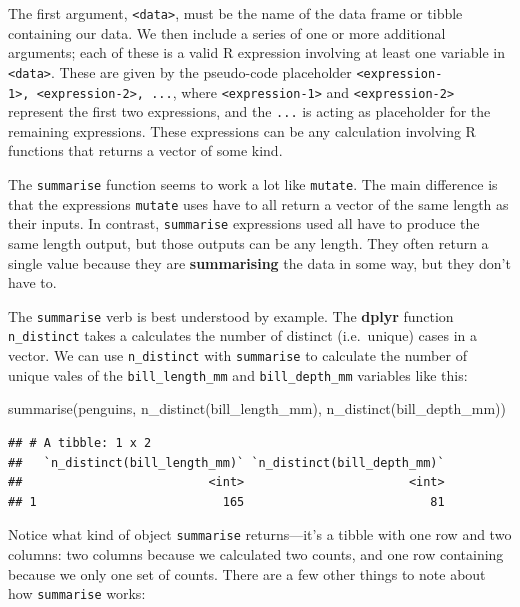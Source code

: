 \documentclass[
]{book}
\newenvironment{Shaded}{\begin{snugshade}}{\end{snugshade}}
\newcommand{\FunctionTok}[1]{\textcolor[rgb]{0.00,0.00,0.00}{#1}}
\newcommand{\NormalTok}[1]{#1}
\begin{document}
The first argument, \texttt{\textless{}data\textgreater{}}, must be the name of the data frame or tibble containing our data. We then include a series of one or more additional arguments; each of these is a valid R expression involving at least one variable in \texttt{\textless{}data\textgreater{}}. These are given by the pseudo-code placeholder \texttt{\textless{}expression-1\textgreater{},\ \textless{}expression-2\textgreater{},\ ...}, where \texttt{\textless{}expression-1\textgreater{}} and \texttt{\textless{}expression-2\textgreater{}} represent the first two expressions, and the \texttt{...} is acting as placeholder for the remaining expressions. These expressions can be any calculation involving R functions that returns a vector of some kind.

The \texttt{summarise} function seems to work a lot like \texttt{mutate}. The main difference is that the expressions \texttt{mutate} uses have to all return a vector of the same length as their inputs. In contrast, \texttt{summarise} expressions used all have to produce the same length output, but those outputs can be any length. They often return a single value because they are \textbf{summarising} the data in some way, but they don't have to.

The \texttt{summarise} verb is best understood by example. The \textbf{dplyr} function \texttt{n\_distinct} takes a calculates the number of distinct (i.e.~unique) cases in a vector. We can use \texttt{n\_distinct} with \texttt{summarise} to calculate the number of unique vales of the \texttt{bill\_length\_mm} and \texttt{bill\_depth\_mm} variables like this:

\begin{Shaded}
\begin{Highlighting}[]
\FunctionTok{summarise}\NormalTok{(penguins, }\FunctionTok{n\_distinct}\NormalTok{(bill\_length\_mm), }\FunctionTok{n\_distinct}\NormalTok{(bill\_depth\_mm))}
\end{Highlighting}
\end{Shaded}

\begin{verbatim}
## # A tibble: 1 x 2
##   `n_distinct(bill_length_mm)` `n_distinct(bill_depth_mm)`
##                          <int>                       <int>
## 1                          165                          81
\end{verbatim}

Notice what kind of object \texttt{summarise} returns---it's a tibble with one row and two columns: two columns because we calculated two counts, and one row containing because we only one set of counts. There are a few other things to note about how \texttt{summarise} works:
\end{document}
